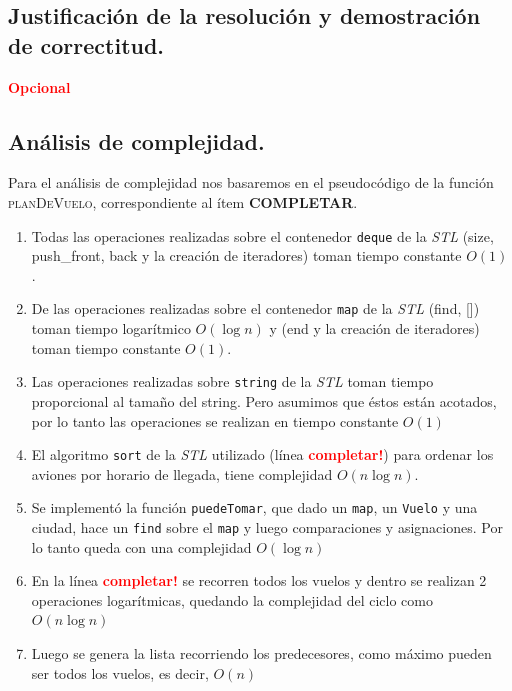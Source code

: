 \newpage
\subsection{Justificación de la resolución y demostración de correctitud.}

\vspace*{0.3cm}

\textcolor{red}{\textbf{Opcional}}



\newpage
\subsection{Análisis de complejidad.}

\vspace*{0.3cm}

Para el análisis de complejidad nos basaremos en el pseudocódigo de la función
\textsc{planDeVuelo}, correspondiente al ítem \textbf{COMPLETAR}.

\begin{enumerate}
  \item Todas las operaciones realizadas sobre el contenedor \verb|deque| de la
    \textit{STL} (size, push_front, back y la creación de iteradores)
    toman tiempo constante $O(1)$.
  \item De las operaciones realizadas sobre el contenedor \verb|map| de la
    \textit{STL} (find, []) toman tiempo logarítmico $O(\log n)$ y (end y la creación de iteradores)
    toman tiempo constante $O(1)$.
  \item Las operaciones realizadas sobre \verb|string| de la \textit{STL} toman
    tiempo proporcional al tamaño del string. Pero asumimos que éstos están
    acotados, por lo tanto las operaciones se realizan en tiempo constante
    $O(1)$
  \item El algoritmo \verb|sort| de la \textit{STL} utilizado (línea \textcolor{red}{\textbf{completar!}}) para ordenar los aviones
    por horario de llegada, tiene complejidad $O(n \log n)$.
  \item Se implementó la función \verb|puedeTomar|, que dado un \verb|map|, un \verb|Vuelo| y
    una ciudad, hace un \verb|find| sobre el \verb|map| y luego comparaciones y asignaciones.
    Por lo tanto queda con una complejidad $O(\log n)$
  \item En la línea \textcolor{red}{\textbf{completar!}} se recorren todos los vuelos
    y dentro se realizan 2 operaciones logarítmicas, quedando la complejidad del
    ciclo como $O(n \log n)$
  \item Luego se genera la lista recorriendo los predecesores, como máximo pueden ser
    todos los vuelos, es decir, $O(n)$
\end{enumerate}


